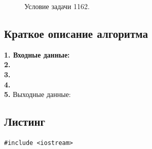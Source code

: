 \documentclass[a5paper, 10pt]{article}
\theoremstyle{definition}
\theoremstyle{plain}
\theoremstyle{remark}
\begin{document}
\begin{figure}[h!]
\caption{Условие задачи 1162.}
\end{figure}

\subsection{Краткое описание алгоритма}
\textbf{1. Входные данные:} \\
\textbf{2.}  \\
\textbf{3.}  \\
\textbf{4.}  \\
\textbf{5.} Выходные данные: 

\subsection{Листинг}

\begin{center}
\begin{lstlisting}[label=some-code,caption={Исходный код для 1162}]
#include <iostream>


\end{lstlisting}
\end{center}
\end{document}
